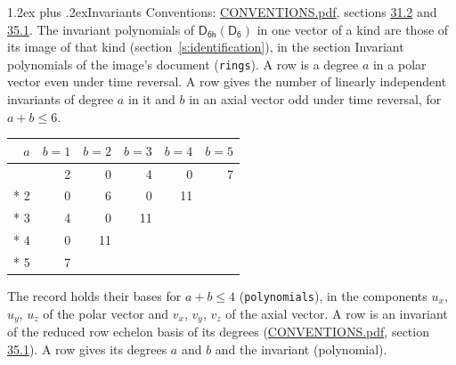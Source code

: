 \documentclass[10pt,a4paper]{article}
\makeatletter
\renewcommand\section{\@startsection{section}{1}{\z@}{-3ex plus -1ex minus -.2ex}%
  {1.2ex plus .2ex}{\normalfont\large\sffamily\bfseries\color{parttitle}}}
\numberwithin{equation}{section}
\newcommand{\grp}[1]{\mathsf{#1}}
\makeatother
\begin{document}
\section{Invariants}\label{s:invariants}
Conventions: \href{../../CONVENTIONS.pdf}{CONVENTIONS.pdf}, sections \href{../../CONVENTIONS.pdf\#conv.31.2}{31.2} and \href{../../CONVENTIONS.pdf\#conv.35.1}{35.1}.
The invariant polynomials of $\grp{D_{6h}}(\grp{D_{6}})$ in one vector of a kind are those of its image of that kind (section~\ref{s:identification}), in the section Invariant polynomials of the image's document (\texttt{rings}).
\leavevmode\label{n:index.degree.polar}\label{n:index.degree.axial}A row is a degree $a$ in a polar vector even under time reversal. A row gives the number of linearly independent invariants of degree $a$ in it and $b$ in an axial vector odd under time reversal, for $a + b \le 6$.
{\small\begin{longtable}{@{}rrrrrr@{}}\toprule
$a$ & $b = 1$ & $b = 2$ & $b = 3$ & $b = 4$ & $b = 5$\\\midrule\endhead
\bottomrule\endfoot\endlastfoot
1 & 2 & 0 & 4 & 0 & 7\\*
2 & 0 & 6 & 0 & 11 & \\*
3 & 4 & 0 & 11 &  & \\*
4 & 0 & 11 &  &  & \\*
5 & 7 &  &  &  & \\
\bottomrule\end{longtable}}
\leavevmode\label{n:local.component.polar}\label{n:local.component.axial}The record holds their bases for $a + b \le 4$ (\texttt{polynomials}), in the components $u_{x}$, $u_{y}$, $u_{z}$ of the polar vector and $v_{x}$, $v_{y}$, $v_{z}$ of the axial vector. \label{n:head.polynomial}A row is an invariant of the reduced row echelon basis of its degrees (\href{../../CONVENTIONS.pdf}{CONVENTIONS.pdf}, section \href{../../CONVENTIONS.pdf\#conv.35.1}{35.1}). A row gives its degrees $a$ and $b$ and the invariant (polynomial).
\end{document}
